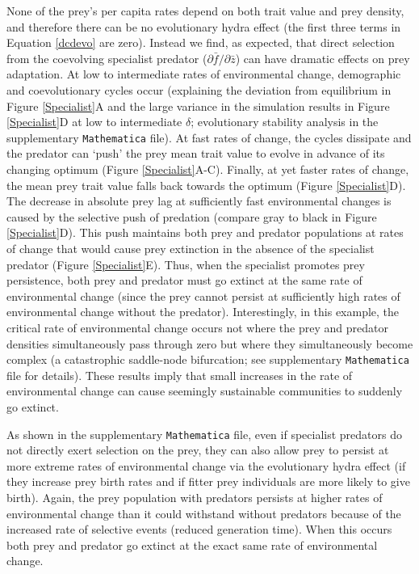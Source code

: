 \documentclass[11pt]{article}
\begin{document}
None of the prey's per capita rates depend on both trait value and prey density, and therefore there can be no evolutionary hydra effect (the first three terms in Equation \ref{dcdevo} are zero).
Instead we find, as expected, that direct selection from the coevolving specialist predator ($\partial \bar{f}/\partial \bar{z}$) can have dramatic effects on prey adaptation.
At low to intermediate rates of environmental change, demographic and coevolutionary cycles occur (explaining the deviation from equilibrium in Figure \ref{Specialist}A and the large variance in the simulation results in Figure \ref{Specialist}D at low to intermediate $\delta$; evolutionary stability analysis in the supplementary \texttt{Mathematica} file).
At fast rates of change, the cycles dissipate and the predator can `push' the prey mean trait value to evolve in advance of its changing optimum (Figure \ref{Specialist}A-C).
Finally, at yet faster rates of change, the mean prey trait value falls back towards the optimum (Figure \ref{Specialist}D).
The decrease in absolute prey lag at sufficiently fast environmental changes is caused by the selective push of predation (compare gray to black in Figure \ref{Specialist}D).
This push maintains both prey and predator populations at rates of change that would cause prey extinction in the absence of the specialist predator (Figure \ref{Specialist}E).
Thus, when the specialist promotes prey persistence, both prey and predator must go extinct at the same rate of environmental change (since the prey cannot persist at sufficiently high rates of environmental change without the predator). 
Interestingly, in this example, the critical rate of environmental change occurs not where the prey and predator densities simultaneously pass through zero but where they simultaneously become complex (a catastrophic saddle-node bifurcation; see supplementary \texttt{Mathematica} file for details).
These results imply that small increases in the rate of environmental change can cause seemingly sustainable communities to suddenly go extinct.

As shown in the supplementary \texttt{Mathematica} file, even if specialist predators do not directly exert selection on the prey, they can also allow prey to persist at more extreme rates of environmental change via the evolutionary hydra effect (if they increase prey birth rates and if fitter prey individuals are more likely to give birth).  
Again, the prey population with predators persists at higher rates of environmental change than it could withstand without predators because of the increased rate of selective events (reduced generation time).
When this occurs both prey and predator go extinct at the exact same rate of environmental change.
\end{document}
